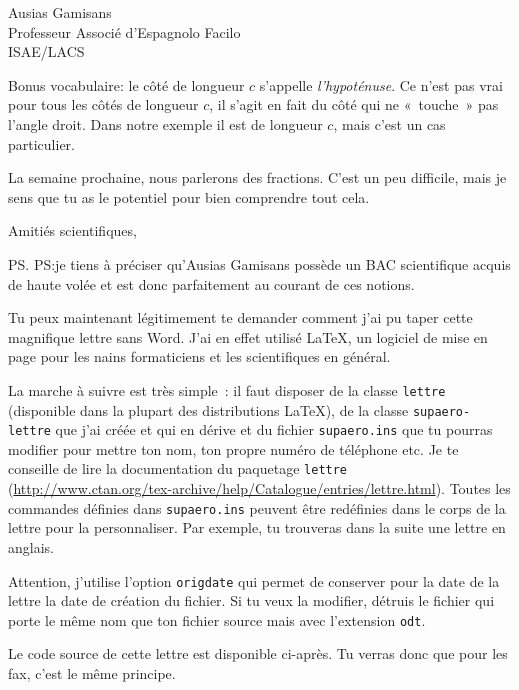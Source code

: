 \documentclass[pdftex,a4paper,12pt,origdate,french]{supaero-lettre}
\begin{document}
\begin{letter}{Ausias Gamisans\\ Professeur Associé d'Espagnolo
    Facilo\\ISAE/LACS}

Bonus vocabulaire: le côté de longueur $c$ s'appelle
\emph{l'hypoténuse}. Ce n'est pas vrai pour tous les côtés de longueur
$c$, il s'agit en fait du côté qui ne «~touche~» pas l'angle
droit. Dans notre exemple il est de longueur $c$, mais c'est un cas
particulier.

La semaine prochaine, nous parlerons des fractions. C'est un peu
difficile, mais je sens que tu as le potentiel pour bien comprendre
tout cela.

\closing{Amitiés scientifiques,}

\ps{PS:}{je tiens à préciser qu'Ausias Gamisans possède un BAC scientifique
acquis de haute volée et est donc parfaitement au courant de ces
notions.}

\vspace{2cm}

Tu peux maintenant légitimement te demander comment j'ai pu taper
cette magnifique lettre sans Word. J'ai en effet utilisé \LaTeX, un
logiciel de mise en page pour les nains formaticiens et les
scientifiques en général.

La marche à suivre est très simple~: il faut disposer de la classe
\texttt{lettre} (disponible dans la plupart des distributions \LaTeX),
de la classe \texttt{supaero-lettre} que j'ai créée et qui en dérive
et du fichier \texttt{supaero.ins} que tu pourras modifier pour mettre
ton nom, ton propre numéro de téléphone etc. Je te conseille de lire
la documentation du paquetage \texttt{lettre}
(\url{http://www.ctan.org/tex-archive/help/Catalogue/entries/lettre.html}). Toutes
les commandes définies dans \texttt{supaero.ins} peuvent être
redéfinies dans le corps de la lettre pour la personnaliser. Par
exemple, tu trouveras dans la suite une lettre en anglais.

Attention, j'utilise l'option \texttt{origdate} qui permet de
conserver pour la date de la lettre la date de création du fichier. Si
tu veux la modifier, détruis le fichier qui porte le même nom que ton
fichier source mais avec l'extension \texttt{odt}.

Le code source de cette lettre est disponible ci-après. Tu verras donc
que pour les fax, c'est le même principe.



\end{letter}
\end{document}
